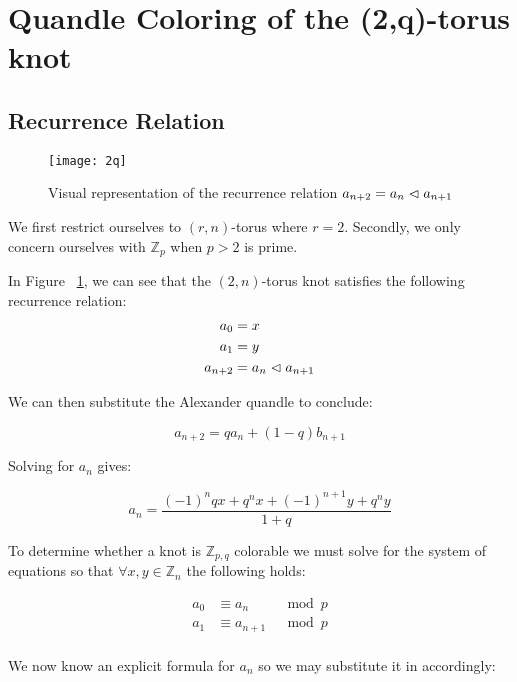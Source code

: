 \documentclass[paper.tex]{subfiles}
\begin{document}
\section{Quandle Coloring of the (2,q)-torus knot}\label{sec:2ntorus}

\subsection{Recurrence Relation}

\begin{figure}[h]
  \centering
  \texttt{[image: 2q]}
  \caption{Visual representation of the recurrence relation $a_{n+2} = a_{n} \vartriangleleft a_{n+1}$~\cite{Cusick}}\label{fig:2q}
\end{figure}

We first restrict ourselves to $(r,n)$-torus where $r = 2$. Secondly, we only concern ourselves with $\mathbb{Z}_p$ when $p > 2$ is prime.

In Figure ~\ref{fig:2q}, we can see that the $(2,n)$-torus knot satisfies the following recurrence relation:
\begin{align*}
	a_0 &= x \\
	a_1 &= y \\
	a_{n+2} &= a_{n} \vartriangleleft a_{n+1} \\
\end{align*}

We can then substitute the Alexander quandle to conclude:

$$ a_{n+2} = qa_{n} + (1-q)b_{n+1} $$

Solving for
 $a_n$ gives:

$$a_n = \frac{(-1)^nqx+q^nx+(-1)^{n+1}y+q^ny}{1+q}$$

To determine whether a knot is $\mathbb{Z}_{p,q}$ colorable we must solve for the system of equations so that $\forall x,y \in \mathbb{Z}_n$ the following holds:

\begin{align*}
	a_0 &\equiv a_{n}  & \mod{p} \\
	a_1 &\equiv a_{n+1} & \mod{p} \\
\end{align*}

We now know an explicit formula for $a_n$ so we may substitute it in accordingly:
\end{document}
